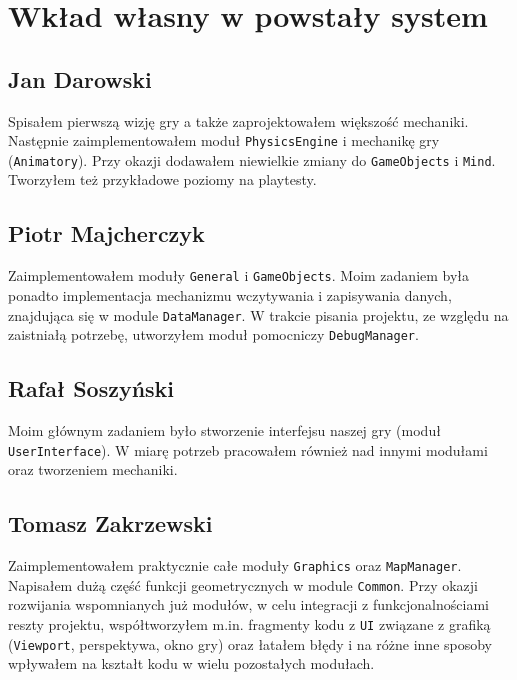 \documentclass[licencjacka]{pracamgr}
\begin{document}
\chapter{Wkład własny w powstały system}

  \section{Jan Darowski}
    Spisałem pierwszą wizję gry a także zaprojektowałem większość mechaniki. Następnie zaimplementowałem moduł \texttt{PhysicsEngine} i
    mechanikę gry (\texttt{Animatory}). Przy okazji dodawałem niewielkie zmiany do \texttt{GameObjects} i \texttt{Mind}. Tworzyłem też
    przykładowe poziomy na playtesty.

  \section{Piotr Majcherczyk}
    Zaimplementowałem moduły \texttt{General} i \texttt{GameObjects}. Moim zadaniem była ponadto implementacja
    mechanizmu wczytywania i zapisywania danych, znajdująca się w module \texttt{DataManager}. W trakcie pisania
    projektu, ze względu na zaistniałą potrzebę, utworzyłem moduł pomocniczy \texttt{DebugManager}.

  \section{Rafał Soszyński}
    Moim głównym zadaniem było stworzenie interfejsu naszej gry (moduł \texttt{UserInterface}). W miarę potrzeb pracowałem również nad innymi modułami
    oraz tworzeniem mechaniki.

  \section{Tomasz Zakrzewski}
    Zaimplementowałem praktycznie całe moduły \texttt{Graphics} oraz \texttt{MapManager}. Napisałem dużą część funkcji
    geometrycznych w module \texttt{Common}. Przy okazji rozwijania wspomnianych już modułów, w celu integracji z
    funkcjonalnościami reszty projektu, współtworzyłem m.in. fragmenty kodu z \texttt{UI} związane z grafiką
    (\texttt{Viewport}, perspektywa, okno gry) oraz łatałem błędy i na różne inne sposoby wpływałem na kształt kodu w
    wielu pozostałych modułach.
\end{document}
